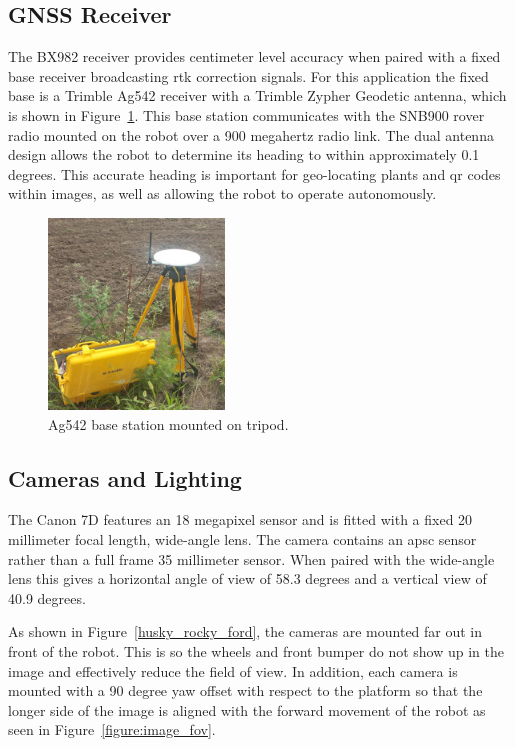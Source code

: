 \subsection{GNSS Receiver}

The BX982 receiver provides centimeter level accuracy when paired with a fixed base receiver broadcasting \ac{rtk} correction signals.  For this application the fixed base is a Trimble Ag542 receiver with a Trimble Zypher Geodetic antenna, which is shown in Figure~\ref{base_station}.  This base station communicates with the SNB900 rover radio mounted on the robot over a 900 megahertz radio link.   The dual antenna design allows the robot to determine its heading to within approximately 0.1 degrees.  This accurate heading is important for geo-locating plants and \ac{qr} codes within images, as well as allowing the robot to operate autonomously. 

\begin{figure}
	\centering
    \includegraphics[height=2in]{figures/sunflower_base_cropped_small.jpg}
    \caption[Base station with tripod]{Ag542 base station mounted on tripod.}
    \label{base_station}
\end{figure}

\subsection{Cameras and Lighting}

The Canon 7D features an 18 megapixel sensor and is fitted with a fixed 20 millimeter focal length, wide-angle lens.  The camera contains an \ac{apsc} sensor rather than a full frame 35 millimeter sensor. When paired with the wide-angle lens this gives a horizontal angle of view of 58.3 degrees and a vertical view of 40.9 degrees.
  
As shown in Figure~\ref{husky_rocky_ford}, the cameras are mounted far out in front of the robot.  This is so the wheels and front bumper do not show up in the image and effectively reduce the field of view.  In addition, each camera is mounted with a 90 degree yaw offset with respect to the platform so that the longer side of the image is aligned with the forward movement of the robot as seen in Figure~\ref{figure:image_fov}.  

